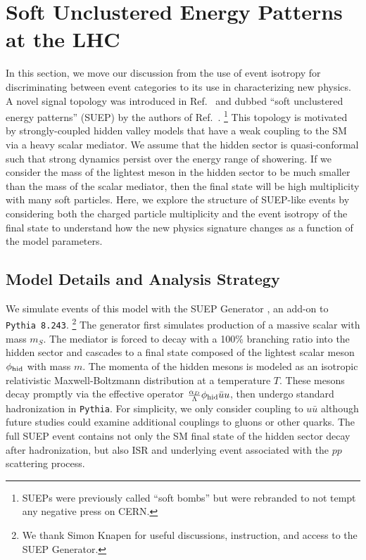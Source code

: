 \documentclass[letterpaper,11pt]{article}
\DeclareRobustCommand{\Ref}[1]{Ref.~\cite{#1}}
\begin{document}

\section{Soft Unclustered Energy Patterns at the LHC}
\label{sec:SUEP}


In this section, we move our discussion from the use of event isotropy for discriminating between event categories to its use in characterizing new physics.
%
A novel signal topology was introduced in \Ref{Strassler:2008bv} and dubbed ``soft unclustered energy patterns'' (SUEP) by the authors of \Ref{Knapen:2016hky}.%
%
\footnote{SUEPs were previously called ``soft bombs'' but were rebranded to not tempt any negative press on CERN.}
%
This topology is motivated by strongly-coupled hidden valley models that have a weak coupling to the SM via a heavy scalar mediator. 
%
We assume that the hidden sector is quasi-conformal such that strong dynamics persist over the energy range of showering. 
%
If we consider the mass of the lightest meson in the hidden sector to be much smaller than the mass of the scalar mediator, then the final state will be high multiplicity with many soft particles. 
%
Here, we explore the structure of SUEP-like events by considering both the charged particle multiplicity and the event isotropy of the final state to understand how the new physics signature changes as a function of the model parameters. 

\subsection{Model Details and Analysis Strategy}


We simulate events of this model with the SUEP Generator \cite{suep_gen2020}, an add-on to \texttt{Pythia 8.243}.%
%
\footnote{We thank Simon Knapen for useful discussions, instruction, and access to the SUEP Generator.} 
%
The generator first simulates production of a massive scalar with mass $m_S$. 
%
The mediator is forced to decay with a 100\% branching ratio into the hidden sector and cascades to a final state composed of the lightest scalar meson $\phi_{\rm hid}$ with mass $m$. 
%
The momenta of the hidden mesons is modeled as an isotropic relativistic Maxwell-Boltzmann distribution at a temperature $T$.
%
These mesons decay promptly via the effective operator $\frac{\alpha_{D}}{\Lambda} \phi_{\rm hid} \bar{u} u$, then undergo standard hadronization in \texttt{Pythia}.
%
For simplicity, we only consider coupling to $u\bar{u}$ although future studies could examine additional couplings to gluons or other quarks.
%
The full SUEP event contains not only the SM final state of the hidden sector decay after hadronization, but also ISR and underlying event associated with the $pp$ scattering process.
\end{document}
